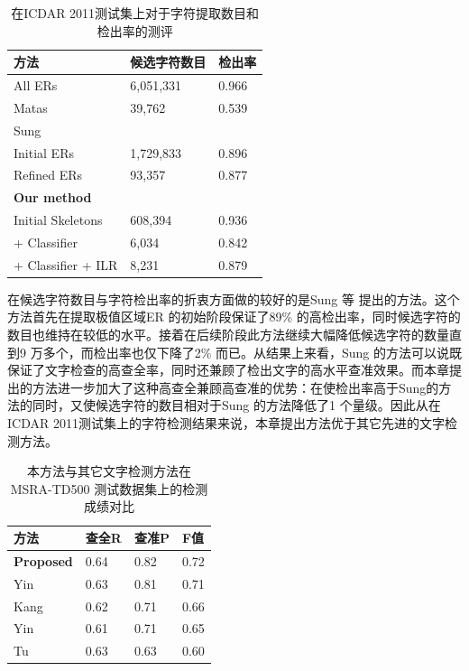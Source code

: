         \begin{table}[htbp]
        \centering
        \caption{在ICDAR 2011测试集上对于字符提取数目和检出率的测评}
        \begin{tabular}{p{}|p{} p{}}
        \hline
        方法 & 候选字符数目 & 检出率 \\
        \hline
        All ERs & 6,051,331 & 0.966 \\
        \hline
        Matas\cite{Matas2004Robust} & 39,762 & 0.539 \\
        \hline
        Sung\cite{Sung2015Scene} &  &  \\
        Initial ERs & 1,729,833 & 0.896 \\
        Refined ERs & 93,357 & 0.877 \\
        \hline
        \textbf{Our method}  &  &  \\
        Initial Skeletons & 608,394 & 0.936 \\
        + Classifier & 6,034 & 0.842 \\
         + Classifier + ILR & 8,231 & 0.879 \\
        \hline
        \end{tabular}
        \label{tab.c3_icdar11}
        \end{table}

        在候选字符数目与字符检出率的折衷方面做的较好的是Sung 等\cite{Sung2015Scene} 提出的方法。这个方法首先在提取极值区域ER 的初始阶段保证了89\% 的高检出率，同时候选字符的数目也维持在较低的水平。接着在后续阶段此方法继续大幅降低候选字符的数量直到9 万多个，而检出率也仅下降了2\% 而已。从结果上来看，Sung 的方法可以说既保证了文字检查的高查全率，同时还兼顾了检出文字的高水平查准效果。而本章提出的方法进一步加大了这种高查全兼顾高查准的优势：在使检出率高于Sung的方法的同时，又使候选字符的数目相对于Sung 的方法降低了1 个量级。因此从在ICDAR 2011测试集上的字符检测结果来说，本章提出方法优于其它先进的文字检测方法。

        \begin{table}[!h]
        \centering
        \caption{ 本方法与其它文字检测方法在MSRA-TD500 测试数据集上的检测成绩对比}
        \begin{tabular}{p{}|p{} p{} p{}}
        \hline
        方法 & 查全R & 查准P & F值 \\
        \hline
        \textbf{Proposed} & 0.64 & 0.82 & 0.72 \\
        Yin\cite{Yin2015Multi} & 0.63 & 0.81 & 0.71 \\
        Kang\cite{Kang2014Orientation} & 0.62 & 0.71 & 0.66 \\
        Yin\cite{Yin2013Robust} & 0.61 & 0.71 & 0.65 \\
        Tu\cite{Tu2012Detecting} & 0.63 & 0.63 & 0.60\\
        \hline
        \end{tabular}
        \label{tab.c3_msra}
        \end{table}


